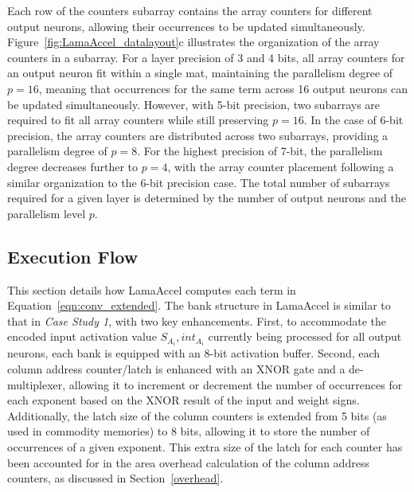 
Each row of the counters subarray contains the array counters for different output neurons, allowing their occurrences to be updated simultaneously. Figure~\ref{fig:LamaAccel_datalayout}c illustrates the organization of the array counters in a subarray. For a layer precision of 3 and 4 bits, all array counters for an output neuron fit within a single mat, maintaining the parallelism degree of $p=16$, meaning that occurrences for the same term across 16 output neurons can be updated simultaneously. However, with 5-bit precision, two subarrays are required to fit all array counters while still preserving $p=16$. In the case of 6-bit precision, the array counters are distributed across two subarrays, providing a parallelism degree of $p=8$. For the highest precision of 7-bit, the parallelism degree decreases further to $p=4$, with the array counter placement following a similar organization to the 6-bit precision case. The total number of subarrays required for a given layer is determined by the number of output neurons and the parallelism level $p$.

\subsection{Execution Flow}\label{ExecutionFlow_cs2}
This section details how LamaAccel computes each term in Equation~\ref{eqn:conv_extended}. The bank structure in LamaAccel is similar to that in \textit{Case Study 1}, with two key enhancements. First, to accommodate the encoded input activation value {$S_{A_{i}}, int_{A_{i}}$} currently being processed for all output neurons, each bank is equipped with an 8-bit activation buffer. Second, each column address counter/latch is enhanced with an XNOR gate and a de-multiplexer, allowing it to increment or decrement the number of occurrences for each exponent based on the XNOR result of the input and weight signs. Additionally, the latch size of the column counters is extended from 5 bits (as used in commodity memories) to 8 bits, allowing it to store the number of occurrences of a given exponent. This extra size of the latch for each counter has been accounted for in the area overhead calculation of the column address counters, as discussed in Section~\ref{overhead}.

